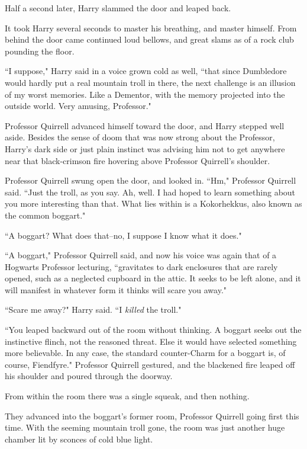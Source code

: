 \later

Half a second later, Harry slammed the door and leaped back.

It took Harry several seconds to master his breathing, and master himself. From behind the door came continued loud bellows, and great slams as of a rock club pounding the floor.

``I suppose," Harry said in a voice grown cold as well, ``that since Dumbledore would hardly put a real mountain troll in there, the next challenge is an illusion of my worst memories. Like a Dementor, with the memory projected into the outside world. Very amusing, Professor."

Professor Quirrell advanced himself toward the door, and Harry stepped well aside. Besides the sense of doom that was now strong about the Professor, Harry's dark side or just plain instinct was advising him not to get anywhere near that black-crimson fire hovering above Professor Quirrell's shoulder.

Professor Quirrell swung open the door, and looked in. ``Hm," Professor Quirrell said. ``Just the troll, as you say. Ah, well. I had hoped to learn something about you more interesting than that. What lies within is a Kokorhekkus, also known as the common boggart."

``A boggart? What does that\---no, I suppose I know what it does."

``A boggart," Professor Quirrell said, and now his voice was again that of a Hogwarts Professor lecturing, ``gravitates to dark enclosures that are rarely opened, such as a neglected cupboard in the attic. It seeks to be left alone, and it will manifest in whatever form it thinks will scare you away."

``Scare me away?" Harry said. ``I \emph{killed} the troll."

``You leaped backward out of the room without thinking. A boggart seeks out the instinctive flinch, not the reasoned threat. Else it would have selected something more believable. In any case, the standard counter-Charm for a boggart is, of course, Fiendfyre." Professor Quirrell gestured, and the blackened fire leaped off his shoulder and poured through the doorway.

From within the room there was a single squeak, and then nothing.

They advanced into the boggart's former room, Professor Quirrell going first this time. With the seeming mountain troll gone, the room was just another huge chamber lit by sconces of cold blue light.

